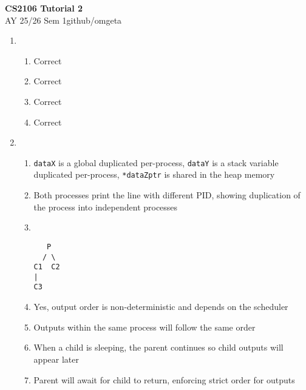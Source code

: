\documentclass[12pt, a4paper]{article}
\newcommand{\mytitle}{CS2106 Tutorial 2}
\newcommand{\myauthor}{github/omgeta}
\newcommand{\mydate}{AY 25/26 Sem 1}
\begin{document}
\raggedright
\footnotesize
\begin{center}
{\normalsize{\textbf{\mytitle}}} \\
{\footnotesize{\mydate\hspace{2pt}\textemdash\hspace{2pt}\myauthor}}
\end{center}
\begin{enumerate}[Q\arabic*.]
  \item 
    \begin{enumerate}[(\alph*.)]
      \item Correct
      \item Correct
      \item Correct
      \item Correct
    \end{enumerate}

  \item 
    \begin{enumerate}[(\alph*.)]
      \item \lstinline|dataX| is a global duplicated per-process, \lstinline|dataY| is a stack variable duplicated per-process, \lstinline|*dataZptr| is shared in the heap memory

      \item Both processes print the line with different PID, showing duplication of the process into independent processes

      \item \quad\\ 
        \begin{lstlisting}
   P
  / \
C1  C2
|
C3
        \end{lstlisting}

      \item Yes, output order is non-deterministic and depends on the scheduler

      \item Outputs within the same process will follow the same order

      \item When a child is sleeping, the parent continues so child outputs will appear later

      \item Parent will await for child to return, enforcing strict order for outputs
    \end{enumerate}


\end{enumerate}
\end{document}
